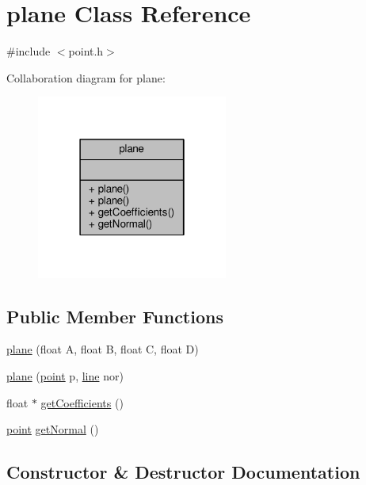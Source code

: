 \hypertarget{classplane}{}\section{plane Class Reference}
\label{classplane}


{\ttfamily \#include $<$point.\+h$>$}



Collaboration diagram for plane\+:\nopagebreak
\begin{figure}[H]
\begin{center}
\leavevmode
\includegraphics[width=178pt]{classplane__coll__graph}
\end{center}
\end{figure}
\subsection*{Public Member Functions}
\begin{DoxyCompactItemize}
\item 
\mbox{\hyperlink{classplane_ac97881e6c8bdc9adaaf1db251b68d485}{plane}} (float A, float B, float C, float D)
\item 
\mbox{\hyperlink{classplane_a63d7a83ca8a345da5ee6de3c67b8de0c}{plane}} (\mbox{\hyperlink{classpoint}{point}} p, \mbox{\hyperlink{classline}{line}} nor)
\item 
float $\ast$ \mbox{\hyperlink{classplane_af4424e6ded2a9c57af4793aea84f56d2}{get\+Coefficients}} ()
\item 
\mbox{\hyperlink{classpoint}{point}} \mbox{\hyperlink{classplane_a4de93e2552aa7be05807f234dd02fbda}{get\+Normal}} ()
\end{DoxyCompactItemize}


\subsection{Constructor \& Destructor Documentation}
\mbox{\label{classplane_ac97881e6c8bdc9adaaf1db251b68d485}} 
